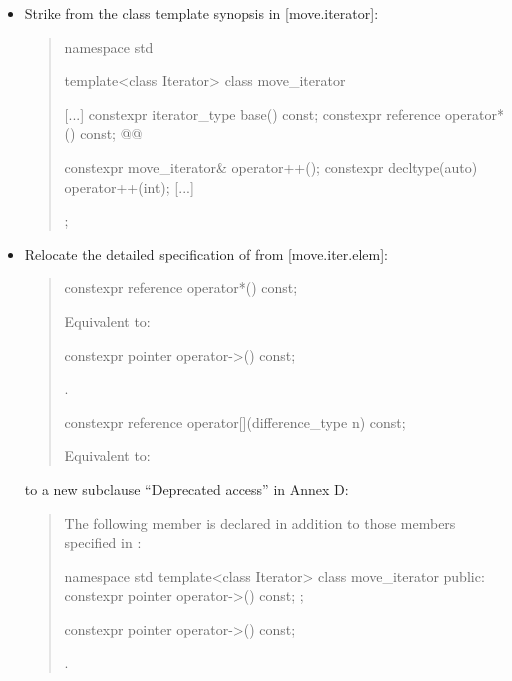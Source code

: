 \begin{itemize}
\item Strike  from the class template synopsis
  in [move.iterator]:
  \begin{quote}
  \begin{codeblock}
namespace std {
  template<class Iterator>
  class move_iterator {
    [...]
    constexpr iterator_type base() const;
    constexpr reference operator*() const;
    @@

    constexpr move_iterator& operator++();
    constexpr decltype(auto) operator++(int);
    [...]
  };
}
  \end{codeblock}
  \end{quote}
\item Relocate the detailed specification of 
  from [move.iter.elem]:
  \begin{quote}
\begin{itemdecl}
constexpr reference operator*() const;
\end{itemdecl}
\setcounter{Paras}{0}
\begin{itemdescr}
\pnum \effects Equivalent to: 
\end{itemdescr}
\begin{removedblock}
\begin{itemdecl}
constexpr pointer operator->() const;
\end{itemdecl}
\begin{itemdescr}
\pnum \returns {}.
\end{itemdescr}
\end{removedblock}
\begin{itemdecl}
constexpr reference operator[](difference_type n) const;
\end{itemdecl}
\begin{itemdescr}
\pnum \effects Equivalent to: 
\end{itemdescr}
  \end{quote}
  to a new subclause ``Deprecated  access'' in Annex D:
  \begin{quote}
  \begin{addedblock}
\setcounter{Paras}{0}
\pnum
The following member is declared in addition to those members specified in
:
\begin{codeblock}
namespace std {
  template<class Iterator>
  class move_iterator {
  public:
    constexpr pointer operator->() const;
  };
}
\end{codeblock}
\begin{itemdecl}
constexpr pointer operator->() const;
\end{itemdecl}
\begin{itemdescr}
\pnum \returns {}.
\end{itemdescr}
  \end{addedblock}
  \end{quote}
\end{itemize}


